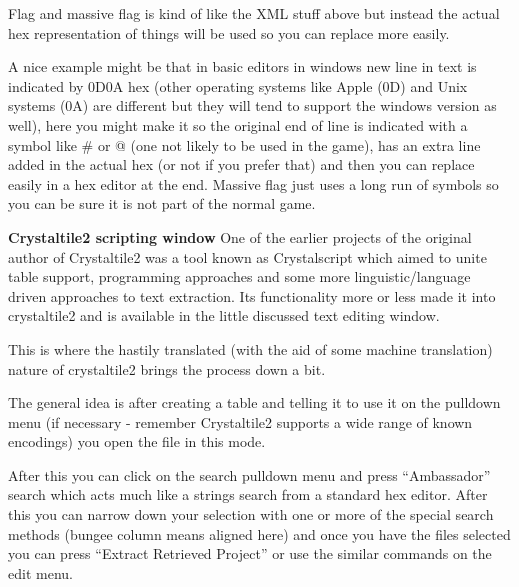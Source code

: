 \documentclass[
]{book}
\begin{document}
Flag and massive flag is kind of like the XML stuff above but instead the actual hex representation of things will be used so you can replace more easily.

A nice example might be that in basic editors in windows new line in text is indicated by 0D0A hex (other operating systems like Apple (0D) and Unix systems (0A) are different but they will tend to support the windows version as well), here you might make it so the original end of line is indicated with a symbol like \# or @ (one not likely to be used in the game), has an extra line added in the actual hex (or not if you prefer that) and then you can replace easily in a hex editor at the end. Massive flag just uses a long run of symbols so you can be sure it is not part of the normal game.

\textbf{Crystaltile2 scripting window} One of the earlier projects of the original author of Crystaltile2 was a tool known as Crystalscript which aimed to unite table support, programming approaches and some more linguistic/language driven approaches to text extraction. Its functionality more or less made it into crystaltile2 and is available in the little discussed text editing window.

This is where the hastily translated (with the aid of some machine translation) nature of crystaltile2 brings the process down a bit.

The general idea is after creating a table and telling it to use it on the pulldown menu (if necessary - remember Crystaltile2 supports a wide range of known encodings) you open the file in this mode.

After this you can click on the search pulldown menu and press ``Ambassador'' search which acts much like a strings search from a standard hex editor. After this you can narrow down your selection with one or more of the special search methods (bungee column means aligned here) and once you have the files selected you can press ``Extract Retrieved Project'' or use the similar commands on the edit menu.
\end{document}
